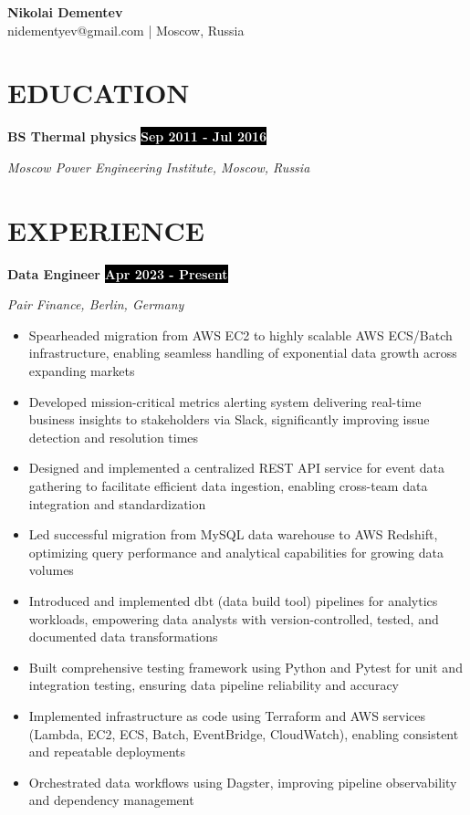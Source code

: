 \documentclass[11pt,a4paper]{article}
\newcommand{\timeperiod}[1]{%
    \hfill{\small\colorbox{black}{\textcolor{white}{\textbf{#1}}}}\par%
}
\begin{document}
\begin{flushright}
{\huge\textbf{Nikolai Dementev}}\\[4pt]
{\normalsize nidementyev@gmail.com | Moscow, Russia}
\end{flushright}

\section{EDUCATION}
\textbf{BS Thermal physics}\timeperiod{Sep 2011 - Jul 2016}
\textit{Moscow Power Engineering Institute, Moscow, Russia}

\section{EXPERIENCE}
\textbf{Data Engineer}\timeperiod{Apr 2023 - Present}
\textit{Pair Finance, Berlin, Germany}
\begin{itemize}
    \item Spearheaded migration from AWS EC2 to highly scalable AWS ECS/Batch infrastructure, enabling seamless handling of exponential data growth across expanding markets
    \item Developed mission-critical metrics alerting system delivering real-time business insights to stakeholders via Slack, significantly improving issue detection and resolution times
    \item Designed and implemented a centralized REST API service for event data gathering to facilitate efficient data ingestion, enabling cross-team data integration and standardization
    \item Led successful migration from MySQL data warehouse to AWS Redshift, optimizing query performance and analytical capabilities for growing data volumes
    \item Introduced and implemented dbt (data build tool) pipelines for analytics workloads, empowering data analysts with version-controlled, tested, and documented data transformations
    \item Built comprehensive testing framework using Python and Pytest for unit and integration testing, ensuring data pipeline reliability and accuracy
    \item Implemented infrastructure as code using Terraform and AWS services (Lambda, EC2, ECS, Batch, EventBridge, CloudWatch), enabling consistent and repeatable deployments
    \item Orchestrated data workflows using Dagster, improving pipeline observability and dependency management
\end{itemize}
\end{document}
